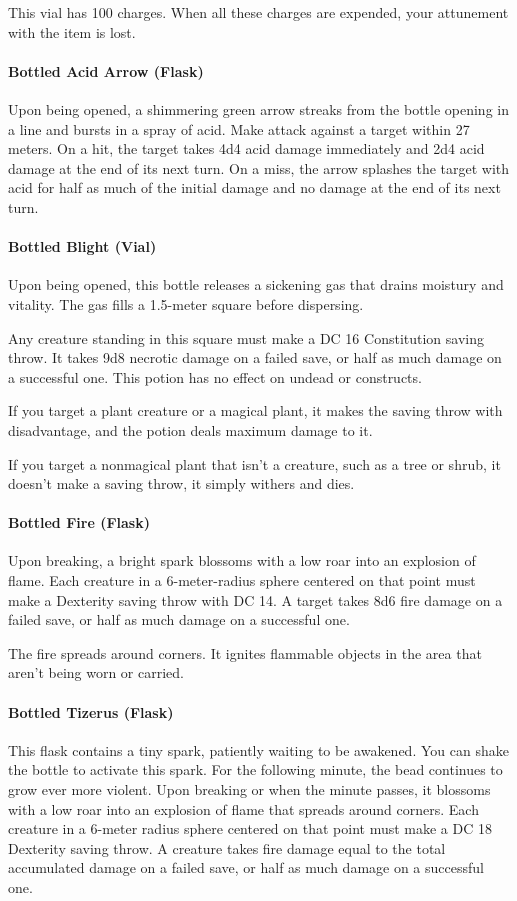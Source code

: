     This vial has 100 charges.
    When all these charges are expended, your attunement with the item is lost.
\paragraph{Bottled Acid Arrow (Flask)} %
    Upon being opened, a shimmering green arrow streaks from the bottle opening in a line and bursts in a spray of acid.
    Make attack against a target within 27 meters.
    On a hit, the target takes 4d4 acid damage immediately and 2d4 acid damage at the end of its next turn.
    On a miss, the arrow splashes the target with acid for half as much of the initial damage and no damage at the end of its next turn.
\paragraph{Bottled Blight (Vial)} %
    Upon being opened, this bottle releases a sickening gas that drains moistury and vitality.
    The gas fills a 1.5-meter square before dispersing.

    Any creature standing in this square must make a DC 16 Constitution saving throw.
    It takes 9d8 necrotic damage on a failed save, or half as much damage on a successful one.
    This potion has no effect on undead or constructs.

    If you target a plant creature or a magical plant, it makes the saving throw with disadvantage, and the potion deals maximum damage to it.

    If you target a nonmagical plant that isn't a creature, such as a tree or shrub, it doesn't make a saving throw, it simply withers and dies.
\paragraph{Bottled Fire (Flask)} %
    Upon breaking, a bright spark blossoms with a low roar into an explosion of flame.
    Each creature in a 6-meter-radius sphere centered on that point must make a Dexterity saving throw with DC 14.
    A target takes 8d6 fire damage on a failed save, or half as much damage on a successful one.

    The fire spreads around corners.
    It ignites flammable objects in the area that aren't being worn or carried.
\paragraph{Bottled Tizerus (Flask)} %
    This flask contains a tiny spark, patiently waiting to be awakened.
    You can shake the bottle to activate this spark.
    For the following minute, the bead continues to grow ever more violent.
    Upon breaking or when the minute passes, it blossoms with a low roar into an explosion of flame that spreads around corners.
    Each creature in a 6-meter radius sphere centered on that point must make a DC 18 Dexterity saving throw.
    A creature takes fire damage equal to the total accumulated damage on a failed save, or half as much damage on a successful one.

